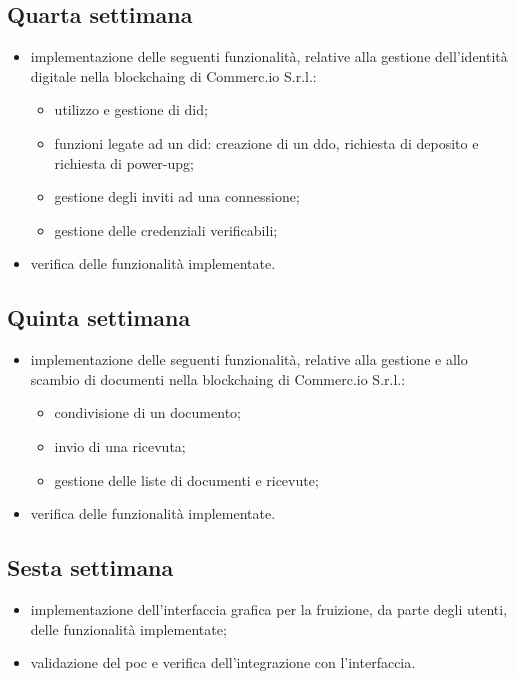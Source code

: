 \subsection{Quarta settimana} 
\begin{itemize}
	\item implementazione delle seguenti funzionalità, relative alla gestione dell'identità digitale nella \gls{blockchaing} di Commerc.io S.r.l.:
	\begin{itemize}
		\item utilizzo e gestione di \gls{did}\glsfirstoccur;
		\item funzioni legate ad un \gls{did}: creazione di un \gls{ddo}\glsfirstoccur, richiesta di deposito e richiesta di \gls{power-upg}\glsfirstoccur;
		\item gestione degli inviti ad una connessione;
		\item gestione delle credenziali verificabili;
	\end{itemize}
	\item verifica delle funzionalità implementate.
\end{itemize}

\subsection{Quinta settimana} 
\begin{itemize}
	\item implementazione delle seguenti funzionalità, relative alla gestione e allo scambio di documenti nella \gls{blockchaing} di Commerc.io S.r.l.:
	\begin{itemize}
		\item condivisione di un documento;
		\item invio di una ricevuta;
		\item gestione delle liste di documenti e ricevute;
	\end{itemize}
	\item verifica delle funzionalità implementate.
\end{itemize}

\subsection{Sesta settimana} 
\begin{itemize}
	\item implementazione dell'interfaccia grafica per la fruizione, da parte degli utenti, delle funzionalità implementate;
	\item validazione del \gls{poc} e verifica dell'integrazione con l'interfaccia.
\end{itemize}

